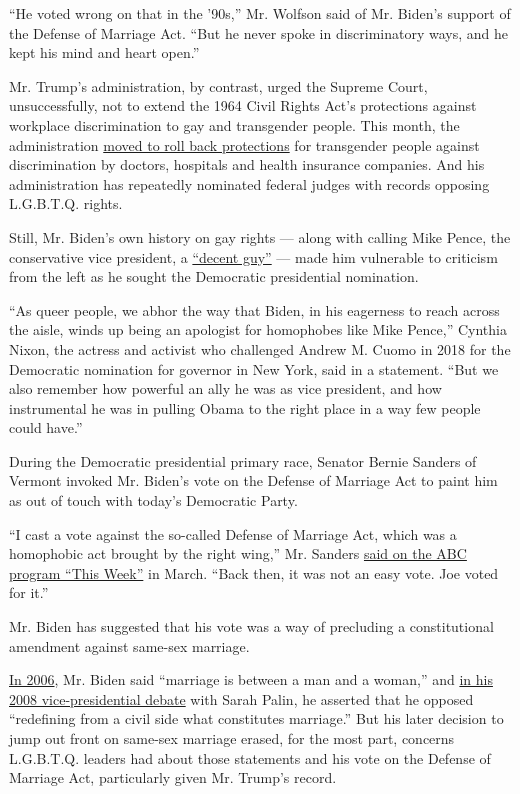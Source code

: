 ``He voted wrong on that in the '90s,'' Mr. Wolfson said of Mr. Biden's
support of the Defense of Marriage Act. ``But he never spoke in
discriminatory ways, and he kept his mind and heart open.''

Mr. Trump's administration, by contrast, urged the Supreme Court,
unsuccessfully, not to extend the 1964 Civil Rights Act's protections
against workplace discrimination to gay and transgender people. This
month, the administration
\href{https://www.nytimes3xbfgragh.onion/2020/06/12/us/politics/trump-transgender-rights.html}{moved
to roll back protections} for transgender people against discrimination
by doctors, hospitals and health insurance companies. And his
administration has repeatedly nominated federal judges with records
opposing L.G.B.T.Q. rights.

Still, Mr. Biden's own history on gay rights --- along with calling Mike
Pence, the conservative vice president, a
\href{https://www.cnn.com/2019/02/28/politics/joe-biden-mike-pence-decent-guy-criticize-respond/index.html}{``decent
guy''} --- made him vulnerable to criticism from the left as he sought
the Democratic presidential nomination.

``As queer people, we abhor the way that Biden, in his eagerness to
reach across the aisle, winds up being an apologist for homophobes like
Mike Pence,'' Cynthia Nixon, the actress and activist who challenged
Andrew M. Cuomo in 2018 for the Democratic nomination for governor in
New York, said in a statement. ``But we also remember how powerful an
ally he was as vice president, and how instrumental he was in pulling
Obama to the right place in a way few people could have.''

During the Democratic presidential primary race, Senator Bernie Sanders
of Vermont invoked Mr. Biden's vote on the Defense of Marriage Act to
paint him as out of touch with today's Democratic Party.

``I cast a vote against the so-called Defense of Marriage Act, which was
a homophobic act brought by the right wing,'' Mr. Sanders
\href{https://abcnews.go.com/Politics/week-transcript-20-sen-bernie-sanders-dr-ben/story?id=69465733}{said
on the ABC program ``This Week''} in March. ``Back then, it was not an
easy vote. Joe voted for it.''

Mr. Biden has suggested that his vote was a way of precluding a
constitutional amendment against same-sex marriage.

\href{http://www.nbcnews.com/id/13085904/ns/meet_the_press/t/transcript-june/}{In
2006}, Mr. Biden said ``marriage is between a man and a woman,'' and
\href{https://www.nytimes3xbfgragh.onion/elections/2008/president/debates/transcripts/vice-presidential-debate.html}{in
his 2008 vice-presidential debate} with Sarah Palin, he asserted that he
opposed ``redefining from a civil side what constitutes marriage.'' But
his later decision to jump out front on same-sex marriage erased, for
the most part, concerns L.G.B.T.Q. leaders had about those statements
and his vote on the Defense of Marriage Act, particularly given Mr.
Trump's record.

